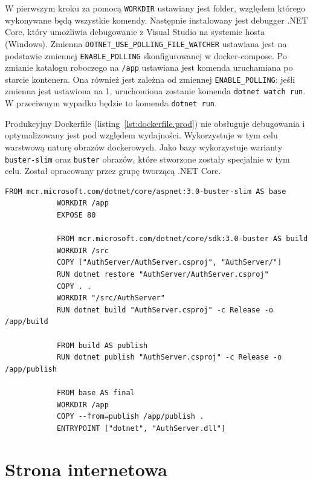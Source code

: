 		W pierwszym kroku za pomocą \verb|WORKDIR| ustawiany jest folder, względem którego wykonywane będą wszystkie komendy.
		Następnie instalowany jest debugger .NET Core, który umożliwia debugowanie z Visual Studio na systemie hosta (Windows).
		Zmienna \verb|DOTNET_USE_POLLING_FILE_WATCHER| ustawiana jest na podstawie zmiennej \verb|ENABLE_POLLING| skonfigurowanej w docker-compose.
		Po zmianie katalogu roboczego na \verb|/app| ustawiana jest komenda uruchamiana po starcie kontenera.
		Ona również jest zależna od zmiennej \verb|ENABLE_POLLING|: jeśli zmienna jest ustawiona na 1, uruchomiona zostanie komenda \verb|dotnet watch run|.
		W przeciwnym wypadku będzie to komenda \verb|dotnet run|.

		Produkcyjny Dockerfile (listing~\ref{lst:dockerfile.prod}) nie obsługuje debugowania i optymalizowany jest pod względem wydajności.
		Wykorzystuje w tym celu warstwową naturę obrazów dockerowych.
		Jako bazy wykorzystuje warianty \verb|buster-slim| oraz \verb|buster| obrazów,
		które stworzone zostały specjalnie w tym celu.
		Został opracowany przez grupę tworzącą .NET Core.

		\begin{lstlisting}[label=lst:dockerfile.prod,caption=Plik Dockerfile budowany warstwowo]
			FROM mcr.microsoft.com/dotnet/core/aspnet:3.0-buster-slim AS base
			WORKDIR /app
			EXPOSE 80
			
			FROM mcr.microsoft.com/dotnet/core/sdk:3.0-buster AS build
			WORKDIR /src
			COPY ["AuthServer/AuthServer.csproj", "AuthServer/"]
			RUN dotnet restore "AuthServer/AuthServer.csproj"
			COPY . .
			WORKDIR "/src/AuthServer"
			RUN dotnet build "AuthServer.csproj" -c Release -o /app/build
			
			FROM build AS publish
			RUN dotnet publish "AuthServer.csproj" -c Release -o /app/publish
			
			FROM base AS final
			WORKDIR /app
			COPY --from=publish /app/publish .
			ENTRYPOINT ["dotnet", "AuthServer.dll"]		
		\end{lstlisting}

\section{Strona internetowa}
